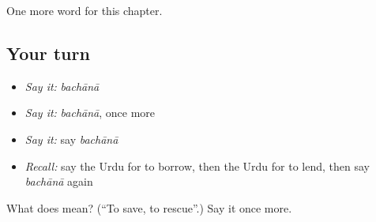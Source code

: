 \begin{grammarlens}[title={What you've built}]
One more word for this chapter.
\end{grammarlens}

\subsection*{Your turn}
\begin{itemize}
\raggedright
  \item \emph{Say it:} \emph{bachānā}
  \item \emph{Say it:} \emph{bachānā}, once more
  \item \emph{Say it:} say \emph{bachānā}
  \item \emph{Recall:} say the Urdu for to borrow, then the Urdu for to lend, then say \emph{bachānā} again
\end{itemize}

\begin{tcolorbox}[breakable,colback=teal!4,colframe=teal!35!black,title={Before you move on}]
What does  mean? (\textquotedblleft{}To save, to rescue\textquotedblright{}.) Say it once more.
\end{tcolorbox}
